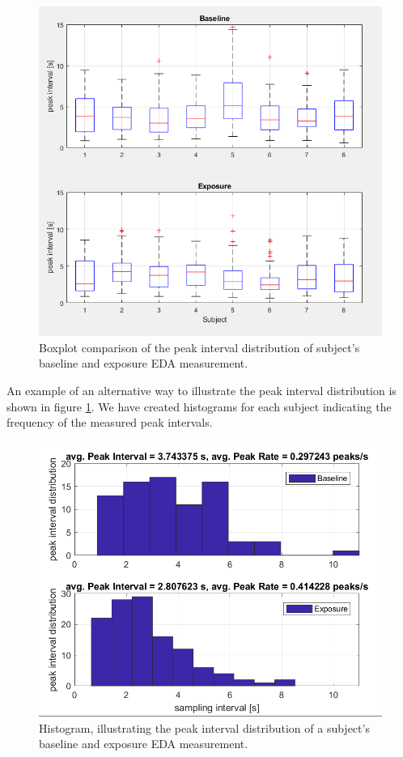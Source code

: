 \begin{figure}[h]
\centering
\includegraphics[width=1\textwidth]{images/EDApid.png}
\caption{Boxplot comparison of the peak interval distribution of subject's baseline and exposure EDA measurement.}
\label{SCLbpImg}
\end{figure}

\newpage
An example of an alternative way to illustrate the peak interval distribution is shown in figure \ref{SCLbpImg}. We have created histograms for each subject indicating the frequency of the measured peak intervals. 

\begin{figure}[h]
\centering
\includegraphics[width=1\textwidth]{images/EDAhisto.png}
\caption{Histogram, illustrating the peak interval distribution of a subject's baseline and exposure EDA measurement.}
\label{EDAhistoImg}
\end{figure}

